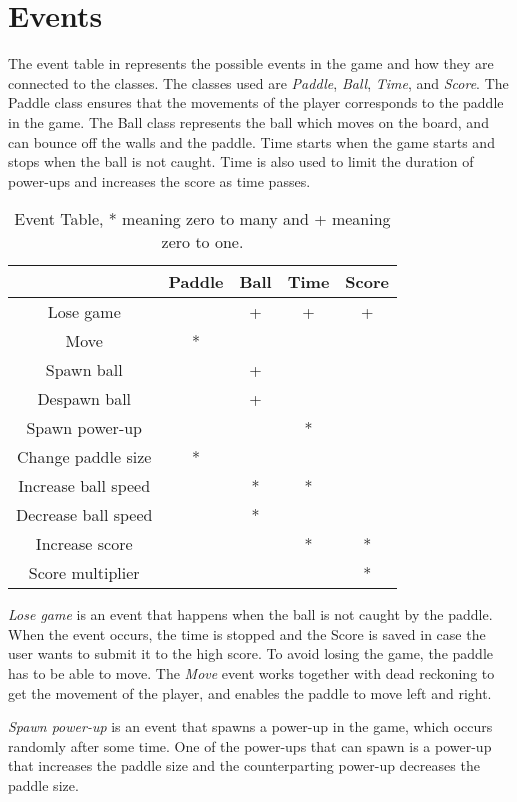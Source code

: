 \section{Events}\label{section:event-table}
The event table in  represents the possible events in the game and how they are connected to the classes.
The classes used are \textit{Paddle}, \textit{Ball}, \textit{Time}, and \textit{Score}.
The Paddle class ensures that the movements of the player corresponds to the paddle in the game.
The Ball class represents the ball which moves on the board, and can bounce off the walls and the paddle. 
Time starts when the game starts and stops when the ball is not caught.
Time is also used to limit the duration of power-ups and increases the score as time passes.

\begin{table}[h]
\centering
\begin{tabular}{| c | c | c | c | c |}
\hline
 & Paddle & Ball & Time & Score \\\hline
Lose game & & + & + & + \\ \hline
Move & * & & & \\ \hline 
Spawn ball & & + & &  \\\hline
Despawn ball & & + & &  \\\hline
Spawn power-up & & & * & \\\hline
Change paddle size  & * & & & \\\hline
Increase ball speed & & * & * & \\\hline
Decrease ball speed & & * & & \\\hline
Increase score & & & * & *\\\hline
Score multiplier & & & & * \\\hline
\end{tabular}
\caption{Event Table, * meaning zero to many and + meaning zero to one.}
\label{table:event-table}
\end{table}

\textit{Lose game} is an event that happens when the ball is not caught by the paddle. 
When the event occurs, the time is stopped and the Score is saved in case the user wants to submit it to the high score.
To avoid losing the game, the paddle has to be able to move.
The \textit{Move} event works together with dead reckoning to get the movement of the player, and enables the paddle to move left and right.

\textit{Spawn power-up} is an event that spawns a power-up in the game, which occurs randomly after some time.
One of the power-ups that can spawn is a power-up that increases the paddle size and the counterparting power-up decreases the paddle size.

